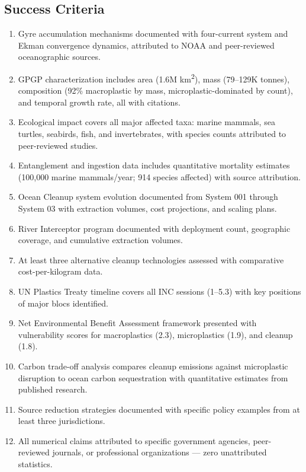 \documentclass[11pt,letterpaper]{article}
\begin{document}
\subsection{Success Criteria}

\begin{enumerate}[leftmargin=2em]
\item Gyre accumulation mechanisms documented with four-current system and Ekman convergence dynamics, attributed to NOAA and peer-reviewed oceanographic sources.
\item GPGP characterization includes area (1.6M km\textsuperscript{2}), mass (79--129K tonnes), composition (92\% macroplastic by mass, microplastic-dominated by count), and temporal growth rate, all with citations.
\item Ecological impact covers all major affected taxa: marine mammals, sea turtles, seabirds, fish, and invertebrates, with species counts attributed to peer-reviewed studies.
\item Entanglement and ingestion data includes quantitative mortality estimates (100,000 marine mammals/year; 914 species affected) with source attribution.
\item Ocean Cleanup system evolution documented from System 001 through System 03 with extraction volumes, cost projections, and scaling plans.
\item River Interceptor program documented with deployment count, geographic coverage, and cumulative extraction volumes.
\item At least three alternative cleanup technologies assessed with comparative cost-per-kilogram data.
\item UN Plastics Treaty timeline covers all INC sessions (1--5.3) with key positions of major blocs identified.
\item Net Environmental Benefit Assessment framework presented with vulnerability scores for macroplastics (2.3), microplastics (1.9), and cleanup (1.8).
\item Carbon trade-off analysis compares cleanup emissions against microplastic disruption to ocean carbon sequestration with quantitative estimates from published research.
\item Source reduction strategies documented with specific policy examples from at least three jurisdictions.
\item All numerical claims attributed to specific government agencies, peer-reviewed journals, or professional organizations --- zero unattributed statistics.
\end{enumerate}
\end{document}

